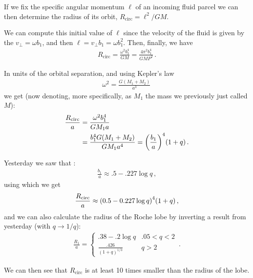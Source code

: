 \documentclass[main.tex]{subfiles}
\begin{document}
If we fix the specific angular momentum \(\ell\) of an incoming fluid parcel we can then determine the radius of its orbit, \(R _{\text{circ}} = \ell^2 / GM\). 

We can compute this initial value of \(\ell\) since the velocity of the fluid is given by the \(v_{\perp} = \omega b_1 \), and then \(\ell = v_\perp b_1 = \omega b_1^2\). 
Then, finally, we have 
%
\begin{align}
R _{\text{circ}} = \frac{\omega^2 b_1^{4}}{GM} = \frac{4 \pi^2 b_1^{4}}{GM P^2}
\,.
\end{align}

In units of the orbital separation, and using Kepler's law 
%
\begin{align}
\omega^2 = \frac{G (M_1 + M_2 )}{a^3}
\,
\end{align}
%
we get (now denoting, more specifically, as \(M_1 \) the mass we previously just called \(M\)):
%
\begin{align}
\frac{R _{\text{circ}}}{a} &= \frac{\omega^2 b_1^{4}}{GM_1  a}  \\
&= \frac{b_1^{4} G (M_1 + M_2 )}{GM_1 a^{4}} = \qty(\frac{b_1 }{a})^{4} (1 + q)
\,.
\end{align}

Yesterday we saw that \cite[]{frankAccretionPowerAstrophysics2002}:
%
\begin{align}
\frac{b_1 }{a} \approx \num{.5} - \num{.227} \log q
\,,
\end{align}
%
using which we get 
%
\begin{align}
\frac{R _{\text{circ}}}{a} \approx \qty(\num{.5} - \num{.227} \log q)^{4} (1+q)
\,,
\end{align}
%
and we can also calculate the radius of the Roche lobe by inverting a result from yesterday (with \(q \to 1/q\)): 
%
\begin{align}
\frac{R_1}{a} = \begin{cases}
    \num{.38} -\num{.2} \log q & \num{.05} < q < 2 \\
    \frac{\num{.426}}{(1 + q)^{1/3}} & q > 2
\end{cases}
\,.
\end{align}

We can then see that \(R _{\text{circ}}\) is at least 10 times smaller than the radius of the lobe.
\end{document}
